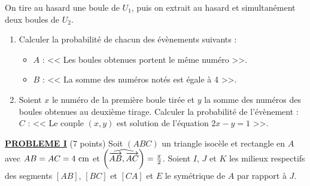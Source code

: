 \begin{enumerate}
                  On tire au hasard une boule de $U_1$, puis on extrait au hasard et simultan\'ement deux boules de $U_2$.
                  \begin{enumerate}
                        \item Calculer la probabilit\'e de chacun des \'ev\`enements suivants : 
                              \begin{itemize}
                                    \item $A$ : << Les boules obtenues portent le m\^eme num\'ero >>.
                                    \item $B$ : << La somme des num\'eros not\'es est \'egale \`a 4 >>.
                              \end{itemize}
                        \item Soient $x$ le num\'ero de la premi\`ere boule tir\'ee et $y$ la somme des num\'eros des 
                              boules obtenues au deuxi\`eme tirage.
                              Calculer la probabilit\'e de l'\'ev\`enement : 
                              $C$ : << Le couple $(x,y)$ est solution de l'\'equation $2 x - y = 1$ >>.
                  \end{enumerate}
      \end{enumerate}
\noindent \underline{\textsc{\textbf{PROBLEME I}}} (7 points) \newline
      Soit $(ABC)$ un triangle isoc\`ele et rectangle en $A$ avec $AB = AC = 4~\mathrm{cm}$ et $\left( \widehat{ \overrightarrow{AB} , \overrightarrow{AC} } \right) = \frac{\pi}{2}$.
      Soient $I$, $J$ et $K$ les milieux respectifs des segments $[AB]$, $[BC]$ et $[CA]$ et $E$ le  sym\'etrique de $A$ 
      par rapport \`a $J$.
